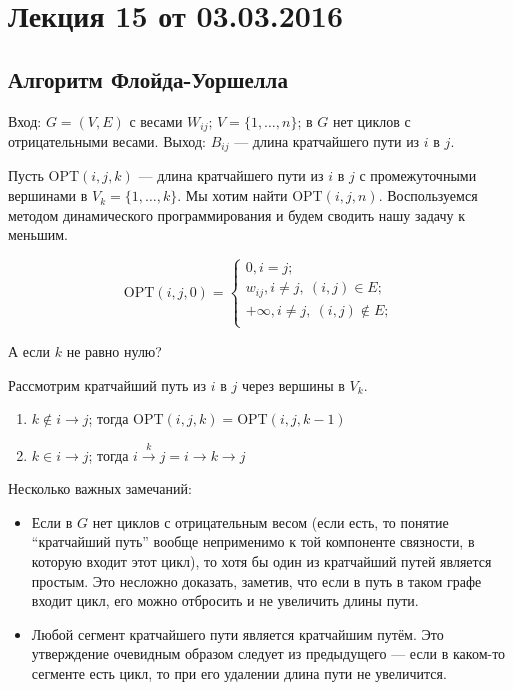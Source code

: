 



\section*{Лекция 15 от 03.03.2016}

\subsection{Алгоритм Флойда-Уоршелла}

Вход: $G = (V, E)$ с весами $W_{ij}$; $V = \{1,\ldots, n\}$; в $G$ нет циклов с отрицательными весами.
Выход: $B_{ij}$ --- длина кратчайшего пути из $i$ в $j$.

Пусть OPT$(i, j, k)$ --- длина кратчайшего пути из $i$ в $j$ с промежуточными вершинами в $V_k = \{1,\ldots,k\}$.
Мы хотим найти OPT$(i, j, n)$. Воспользуемся методом динамического программирования и будем сводить нашу задачу к меньшим.

\[
    \mathrm{OPT}(i, j, 0) =
    \begin{cases}
        0, i=j;\\
        w_{ij}, i\neq j,\ (i,j) \in E;\\
        +\infty, i\neq j,\ (i,j) \not\in E;\\
    \end{cases}
\]

А если $k$ не равно нулю?

Рассмотрим кратчайший путь из $i$ в $j$ через вершины в $V_k$.
\begin{enumerate}
    \item $k \not \in i \longrightarrow j$; тогда OPT$(i, j, k) = \mathrm{OPT}(i, j, k-1)$
    \item $k \in i \longrightarrow j$; тогда $i \xrightarrow{\ \ k\ \ } j =  i \longrightarrow k \longrightarrow j$
\end{enumerate}

Несколько важных замечаний:
\begin{itemize}
    \item Если в $G$ нет циклов с отрицательным весом (если есть, то понятие ``кратчайший путь'' вообще неприменимо к той компоненте связности, в которую входит этот цикл), то хотя бы один из кратчайший путей является простым. Это несложно доказать, заметив, что если в путь в таком графе входит цикл, его можно отбросить и не увеличить длины пути.
    \item Любой сегмент кратчайшего пути является кратчайшим путём. Это утверждение очевидным образом следует из предыдущего --- если в каком-то сегменте есть цикл, то при его удалении длина пути не увеличится. 
\end{itemize}

